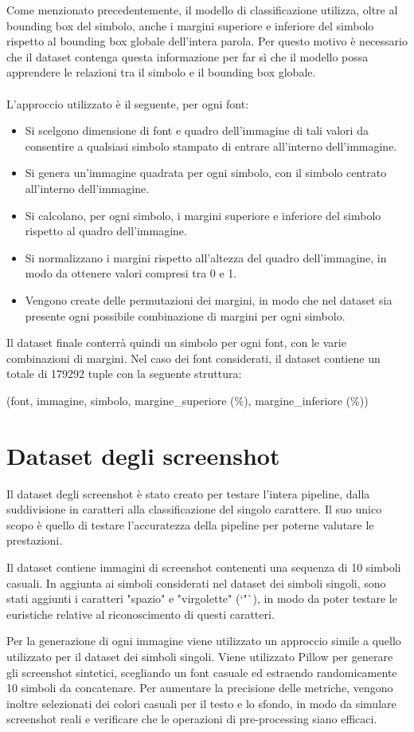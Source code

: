 Come menzionato precedentemente, il modello di classificazione utilizza, oltre al bounding box del simbolo, anche i margini superiore e inferiore del simbolo rispetto al bounding box globale dell'intera parola. Per questo motivo è necessario che il dataset contenga questa informazione per far sì che il modello possa apprendere le relazioni tra il simbolo e il bounding box globale.
\\ \\
L'approccio utilizzato è il seguente, per ogni font:
\begin{itemize}
	\item Si scelgono dimensione di font e quadro dell'immagine di tali valori da consentire a qualsiasi simbolo stampato di entrare all'interno dell'immagine.
	\item Si genera un'immagine quadrata per ogni simbolo, con il simbolo centrato all'interno dell'immagine.
	\item Si calcolano, per ogni simbolo, i margini superiore e inferiore del simbolo rispetto al quadro dell'immagine.
	\item Si normalizzano i margini rispetto all'altezza del quadro dell'immagine, in modo da ottenere valori compresi tra 0 e 1.
	\item Vengono create delle permutazioni dei margini, in modo che nel dataset sia presente ogni possibile combinazione di margini per ogni simbolo.
\end{itemize}

Il dataset finale conterrà quindi un simbolo per ogni font, con le varie combinazioni di margini.  Nel caso dei font considerati, il dataset contiene un totale di 179292 tuple con la seguente struttura:
\begin{center}
(font, immagine, simbolo, margine\_superiore (\%), margine\_inferiore (\%))
\end{center}

\section{Dataset degli screenshot}

Il dataset degli screenshot è stato creato per testare l'intera pipeline, dalla suddivisione in caratteri alla classificazione del singolo carattere. Il suo unico scopo è quello di testare l'accuratezza della pipeline per poterne valutare le prestazioni. 

Il dataset contiene immagini di screenshot contenenti una sequenza di 10 simboli casuali. In aggiunta ai simboli considerati nel dataset dei simboli singoli, sono stati aggiunti i caratteri "spazio" e "virgolette" (`"`), in modo da poter testare le euristiche relative al riconoscimento di questi caratteri.

Per la generazione di ogni immagine viene utilizzato un approccio simile a quello utilizzato per il dataset dei simboli singoli. Viene utilizzato Pillow per generare gli screenshot sintetici, scegliando un font casuale ed estraendo randomicamente 10 simboli da concatenare. Per aumentare la precisione delle metriche, vengono inoltre selezionati dei colori casuali per il testo e lo sfondo, in modo da simulare screenshot reali e verificare che le operazioni di pre-processing siano efficaci.


